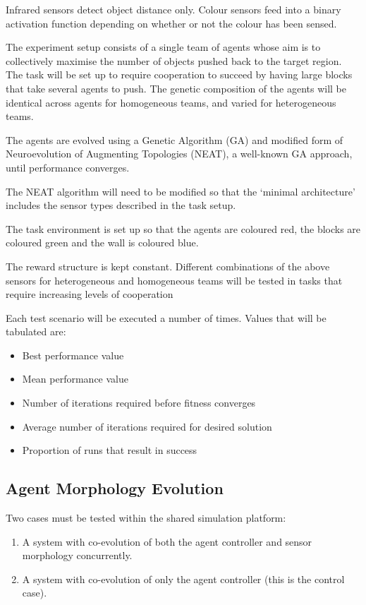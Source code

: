 \documentclass[a4paper,12pt]{article}
\begin{document}
Infrared sensors detect object distance only. Colour sensors feed into a binary activation function depending on whether or not the colour has been sensed.

The experiment setup consists of a single team of agents whose aim is to collectively maximise the number of objects pushed back to the target region. The task will be set up to require cooperation to succeed by having large blocks that take several agents to push. The genetic composition of the agents will be identical across agents for homogeneous teams, and varied for heterogeneous teams.

The agents are evolved using a Genetic Algorithm (GA) and modified form of Neuroevolution of Augmenting Topologies (NEAT), a well-known GA approach\cite{Stanley02}, until performance converges.

The NEAT algorithm will need to be modified so that the ‘minimal architecture’ includes the sensor types described in the task setup.

The task environment is set up so that the agents are coloured red, the blocks are coloured green and the wall is coloured blue.

The reward structure is kept constant. Different combinations of the above sensors for heterogeneous and homogeneous teams will be tested in tasks that require increasing levels of cooperation

Each test scenario will be executed a number of times. Values that will be tabulated are:
\begin{itemize}
\item Best performance value
\item Mean performance value
\item Number of iterations required before fitness converges
\item Average number of iterations required for desired solution
\item Proportion of runs that result in success
\end{itemize}

\subsection{Agent Morphology Evolution}

Two cases must be tested within the shared simulation platform:
\begin{enumerate}
\item A system with co-evolution of both the agent controller and sensor morphology concurrently.
\item A system with co-evolution of only the agent controller (this is the control case).
\end{enumerate}
\end{document}
